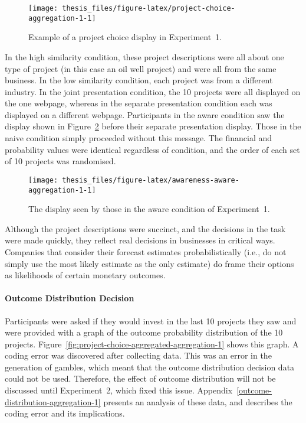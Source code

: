 \documentclass[a4paper, nobind]{templates/ociamthesis}
\theoremstyle{definition}
\theoremstyle{definition}
\theoremstyle{definition}
\theoremstyle{definition}
\theoremstyle{remark}
\begin{document}
\begin{figure}
\texttt{[image: thesis\_files/figure-latex/project-choice-aggregation-1-1]} \caption{Example of a project choice display in Experiment~1.}\label{fig:project-choice-aggregation-1}
\end{figure}

In the high similarity condition, these project descriptions were all about one
type of project (in this case an oil well project) and were all from the same
business. In the low similarity condition, each project was from a different
industry. In the joint presentation condition, the 10 projects were all
displayed on the one webpage, whereas in the separate presentation condition
each was displayed on a different webpage. Participants in the aware condition
saw the display shown in Figure~\ref{fig:awareness-aware-aggregation-1} before
their separate presentation display. Those in the naive condition simply
proceeded without this message. The financial and probability values were
identical regardless of condition, and the order of each set of 10 projects was
randomised.



\begin{figure}
\texttt{[image: thesis\_files/figure-latex/awareness-aware-aggregation-1-1]} \caption{The display seen by those in the aware condition of Experiment~1.}\label{fig:awareness-aware-aggregation-1}
\end{figure}

Although the project descriptions were succinct, and the decisions in the task
were made quickly, they reflect real decisions in businesses in critical ways.
Companies that consider their forecast estimates probabilistically (i.e., do not
simply use the most likely estimate as the only estimate) do frame their options
as likelihoods of certain monetary outcomes.

\hypertarget{outcome-distribution-materials-aggregation-1}{%
\paragraph{Outcome Distribution Decision}\label{outcome-distribution-materials-aggregation-1}}

Participants were asked if they would invest in the last 10 projects they saw
and were provided with a graph of the outcome probability distribution of the 10
projects. Figure~\ref{fig:project-choice-aggregated-aggregation-1} shows this
graph. A coding error was discovered after collecting data. This was an error in
the generation of gambles, which meant that the outcome distribution decision
data could not be used. Therefore, the effect of outcome distribution will not
be discussed until Experiment~2, which fixed this issue.
Appendix~\ref{outcome-distribution-aggregation-1} presents an analysis of these
data, and describes the coding error and its implications.
\end{document}

